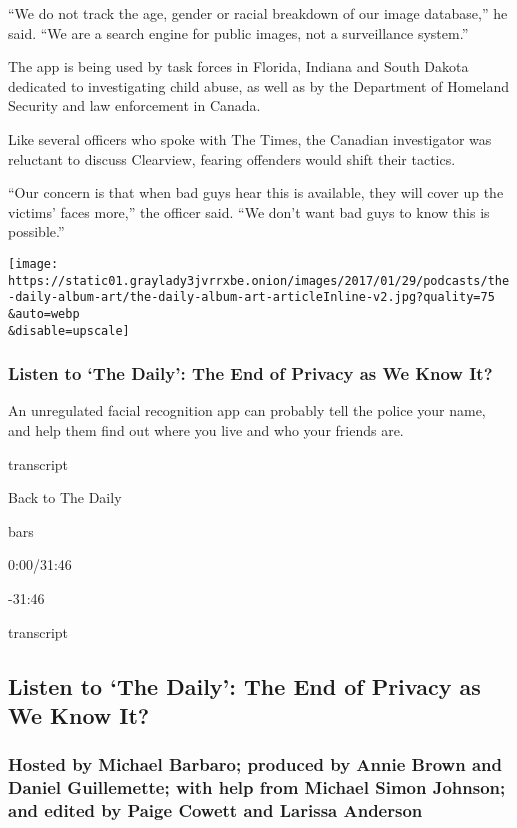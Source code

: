 ``We do not track the age, gender or racial breakdown of our image
database,'' he said. ``We are a search engine for public images, not a
surveillance system.''

The app is being used by task forces in Florida, Indiana and South
Dakota dedicated to investigating child abuse, as well as by the
Department of Homeland Security and law enforcement in Canada.

Like several officers who spoke with The Times, the Canadian
investigator was reluctant to discuss Clearview, fearing offenders would
shift their tactics.

``Our concern is that when bad guys hear this is available, they will
cover up the victims' faces more,'' the officer said. ``We don't want
bad guys to know this is possible.''

\texttt{[image: https://static01.graylady3jvrrxbe.onion/images/2017/01/29/podcasts/the-daily-album-art/the-daily-album-art-articleInline-v2.jpg?quality=75\\\&auto=webp\\\&disable=upscale]}

\hypertarget{listen-to-the-daily-the-end-of-privacy-as-we-know-it}{%
\subsubsection{Listen to `The Daily': The End of Privacy as We Know
It?}\label{listen-to-the-daily-the-end-of-privacy-as-we-know-it}}

An unregulated facial recognition app can probably tell the police your
name, and help them find out where you live and who your friends are.

transcript

Back to The Daily

bars

0:00/31:46

-31:46

transcript

\hypertarget{listen-to-the-daily-the-end-of-privacy-as-we-know-it-1}{%
\subsection{Listen to `The Daily': The End of Privacy as We Know
It?}\label{listen-to-the-daily-the-end-of-privacy-as-we-know-it-1}}

\hypertarget{hosted-by-michael-barbaro-produced-by-annie-brown-and-daniel-guillemette-with-help-from-michael-simon-johnson-and-edited-by-paige-cowett-and-larissa-anderson}{%
\subsubsection{Hosted by Michael Barbaro; produced by Annie Brown and
Daniel Guillemette; with help from Michael Simon Johnson; and edited by
Paige Cowett and Larissa
Anderson}\label{hosted-by-michael-barbaro-produced-by-annie-brown-and-daniel-guillemette-with-help-from-michael-simon-johnson-and-edited-by-paige-cowett-and-larissa-anderson}}

